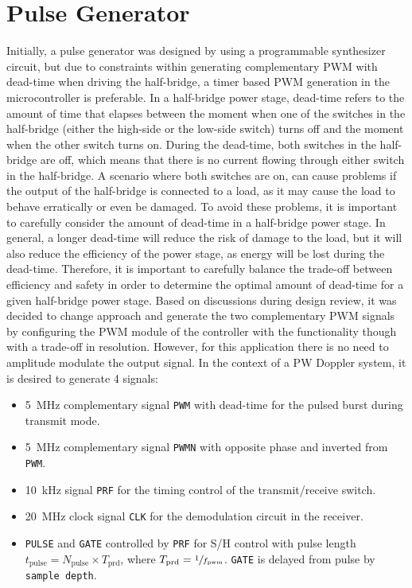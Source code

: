 \section{Pulse Generator}
Initially, a pulse generator was designed by using a programmable synthesizer circuit, but due to constraints within generating complementary PWM with dead-time when driving the half-bridge, a timer based PWM generation in the microcontroller is preferable. In a half-bridge power stage, dead-time refers to the amount of time that elapses between the moment when one of the switches in the half-bridge (either the high-side or the low-side switch) turns off and the moment when the other switch turns on. During the dead-time, both switches in the half-bridge are off, which means that there is no current flowing through either switch in the half-bridge. A scenario where both switches are on, can cause problems if the output of the half-bridge is connected to a load, as it may cause the load to behave erratically or even be damaged. To avoid these problems, it is important to carefully consider the amount of dead-time in a half-bridge power stage. In general, a longer dead-time will reduce the risk of damage to the load, but it will also reduce the efficiency of the power stage, as energy will be lost during the dead-time. Therefore, it is important to carefully balance the trade-off between efficiency and safety in order to determine the optimal amount of dead-time for a given half-bridge power stage. Based on discussions during design review, it was decided to change approach and generate the two complementary PWM signals by configuring the PWM module of the controller with the functionality though with a trade-off in resolution. However, for this application there is no need to amplitude modulate the output signal.
In the context of a PW Doppler system, it is desired to generate 4 signals:
\begin{itemize}
	\item \qty{5}{\mega\hertz} complementary signal \texttt{PWM} with dead-time for the pulsed burst during transmit mode.
	\item \qty{5}{\mega\hertz} complementary signal \texttt{PWMN} with opposite phase and inverted from \texttt{PWM}.
	\item \qty{10}{\kilo\hertz} signal \texttt{PRF} for the timing control of the transmit/receive switch.
	\item \qty{20}{\mega\hertz} clock signal \texttt{CLK} for the demodulation circuit in the receiver.
	\item \texttt{PULSE} and \texttt{GATE} controlled by \texttt{PRF} for S/H control with pulse length $t_{\mathrm{pulse}} = N_{\mathrm{pulse}} \times T_{\mathrm{prd}}$, where $T_{\mathrm{prd}} = \sfrac{1}{f_{\mathrm{pwm}}}$. \texttt{GATE} is delayed from pulse by \texttt{sample depth}.
\end{itemize}

